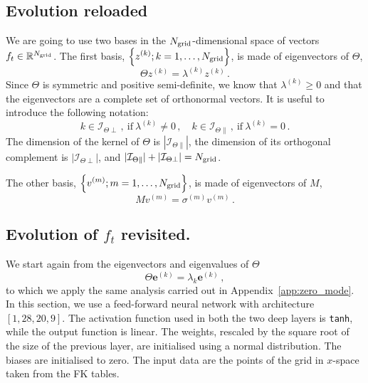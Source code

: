 \documentclass[11pt]{article}
\begin{document}

\subsection{Evolution reloaded}
\label{sec:EvolReload}

We are going to use two bases in the $N_{\mathrm{grid}}$-dimensional space of vectors $f_t \in \mathbb{R}^{N_{\mathrm{grid}}}$. 
The first basis, $\displaystyle \left\{z^{(k)}; k = 1, \ldots, N_{\mathrm{grid}}\right\}$, is made of eigenvectors of $\Theta$, 
\begin{equation}
  \label{eq:ThetaEigenVect}
  \Theta z^{(k)} = \lambda^{(k)} z^{(k)}\, .
\end{equation}
Since $\Theta$ is symmetric and positive semi-definite, we know that $\lambda^{(k)}\geq 0$ and that 
the eigenvectors are a complete set of orthonormal vectors. It is useful to introduce the following 
notation: 
\begin{equation}
  \label{eq:KernelIndices}
  k \in \mathcal{I}_{\Theta\perp}\, , ~\text{if}~\lambda^{(k)} \neq 0\, , 
  \quad k \in \mathcal{I}_{\Theta\parallel}\, , ~\text{if}~\lambda^{(k)} = 0\, .
\end{equation}
The dimension of the kernel of $\Theta$ is $|\mathcal{I}_{\Theta\parallel}|$, the dimension of its orthogonal 
complement is $|\mathcal{I}_{\Theta\perp}|$, and $|\mathcal{I}_{\Theta\parallel}|+|\mathcal{I}_{\Theta\perp}| = N_{\mathrm{grid}}$.

The other basis, $\displaystyle \left\{v^{(m)}; m = 1, \ldots, N_{\mathrm{grid}}\right\}$, is made of eigenvectors of $M$, 
\begin{equation}
  \label{eq:MmatEigenVect}
  M v^{(m)} = \sigma^{(m)} v^{(m)}\, .
\end{equation}


\subsection{Evolution of $f_t$ revisited.}
We start again from the eigenvectors and eigenvalues of $\Theta$
\begin{equation}
  \Theta \pmb{e}^{(k)} = \lambda_k \pmb{e}^{(k)}\,,
\end{equation}
to which we apply the same analysis carried out in Appendix~\ref{app:zero_mode}.
In this section, we use a feed-forward neural network with architecture
$[1,28,20,9]$. The activation function used in both the two deep layers is
\texttt{tanh}, while the output function is linear. The weights, rescaled by the
square root of the size of the previous layer, are initialised using a normal
distribution. The biases are initialised to zero. The input data are the points
of the grid in $x$-space taken from the FK tables.
\end{document}
